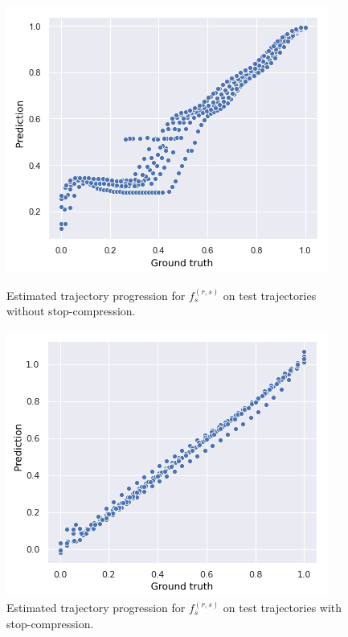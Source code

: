 \begin{figure}[H]
  \begin{minipage}{.46\textwidth}
    \includegraphics[scale=0.48,width=\textwidth]{figures/traj-without-stop-compression3.png}
    \caption{Estimated trajectory progression for $f_s^{(r, s)}$ on test trajectories without stop-compression.}
    \label{fig:progression-without-stop-compression}
  \end{minipage}
  \hspace{5pt}
  \begin{minipage}{.46\textwidth}
    \includegraphics[scale=0.5,width=\textwidth]{figures/traj-with-stop-compression3.png}
    \caption{Estimated trajectory progression for $f_s^{(r, s)}$ on test trajectories with stop-compression.}
    \label{fig:progression-with-stop-compression}
  \end{minipage}
\end{figure}

